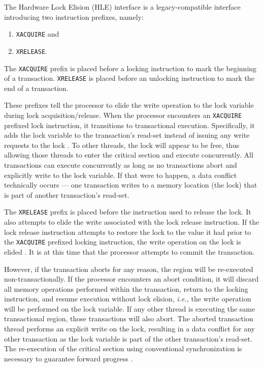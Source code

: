\documentclass[11pt]{book}
\begin{document}
The Hardware Lock Elision (HLE) interface is a legacy-compatible interface introducing two
instruction prefixes, namely: 

\vspace*{-\bigskipamount}
\begin{singlespace}
\begin{enumerate}
  \item \texttt{XACQUIRE} and 
  \item \texttt{XRELEASE}.
\end{enumerate}
\end{singlespace}

\noindent
The \texttt{XACQUIRE} prefix is placed before a locking instruction to mark the beginning
of a transaction.  \texttt{XRELEASE} is placed before an unlocking instruction to mark the
end of a transaction.

These prefixes tell the processor to elide the write operation to the lock variable during
lock acquisition/release.  When the processor encounters an \texttt{XACQUIRE} prefixed
lock instruction, it transitions to transactional execution.  Specifically, it adds the
lock variable to the transaction's read-set instead of issuing any write requests to the
lock \cite{intel_prog_ref}.  To other threads, the lock will appear to be free, thus
allowing those threads to enter the critical section and execute concurrently.  All
transactions can execute concurrently as long as no transactions abort and explicitly
write to the lock variable.  If that were to happen, a data conflict technically occurs
--- one transaction writes to a memory location (the lock) that is part of another
transaction's read-set.

The \texttt{XRELEASE} prefix is placed before the instruction used to release the lock.
It also attempts to elide the write associated with the lock release instruction.  If the
lock release instruction attempts to restore the lock to the value it had prior to the
\texttt{XACQUIRE} prefixed locking instruction, the write operation on the lock is elided
\cite{intel_prog_ref}.  It is at this time that the processor attempts to commit the
transaction.

However, if the transaction aborts for any reason, the region will be re-executed
non-transactionally.  If the processor encounters an abort condition, it will discard all
memory operations performed within the transaction, return to the locking instruction, and
resume execution without lock elision, \emph{i.e.,} the write operation will be performed
on the lock variable.  If any other thread is executing the same transactional region,
those transactions will also abort.  The aborted transaction thread performs an explicit
write on the lock, resulting in a data conflict for any other transaction as the lock
variable is part of the other transaction's read-set.  The re-execution of the critical
section using conventional synchronization is necessary to guarantee forward progress
\cite{intel_prog_ref}.
\end{document}
